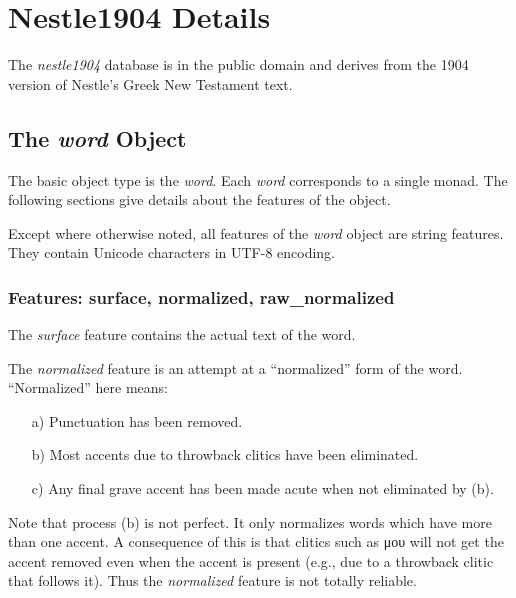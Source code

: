 \documentclass[11pt,oneside,a4paper]{memoir}
\begin{document}
\chapter{Nestle1904 Details}\label{app-nestle}

The \emph{nestle1904} database is in the public domain and derives from the 1904
version of Nestle's Greek New Testament text.

\section{The \emph{word} Object}

The basic object type is the \emph{word}. Each \emph{word} corresponds to a
single monad. The following sections give details about the features of the object.

Except where otherwise noted, all features of the \emph{word} object are string features. They
contain Unicode characters in UTF-8 encoding.

\subsection{Features: surface, normalized, raw\_normalized}

The \emph{surface} feature contains the actual text of the word.

The \emph{normalized} feature is an attempt at a ``normalized'' form of the word. ``Normalized''
here means:

\begin{itemize}
\item[a)] Punctuation has been removed.
\item[b)] Most accents due to throwback clitics have been eliminated.
\item[c)] Any final grave accent has been made acute when not eliminated by (b).
\end{itemize}

Note that process (b) is not perfect. It only normalizes words which have more than one accent. A
consequence of this is that clitics such as μου will not get the accent removed even when the accent
is present (e.g., due to a throwback clitic that follows it). Thus the \emph{normalized} feature is
not totally reliable.
\end{document}
